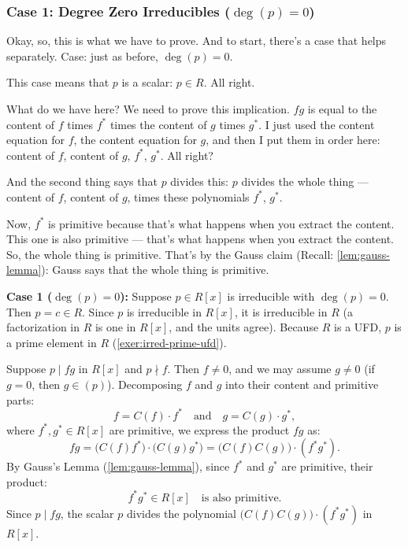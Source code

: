 \begin{proofWrapper}
\subsubsection{Case 1: Degree Zero Irreducibles (\texorpdfstring{$\deg(p) = 0$}{deg(p) = 0})}

\begin{speech}[00:33:17 - 00:34:58]
Okay, so, this is what we have to prove. And to start, there's a case that helps separately. Case:  just as before, $\deg(p) = 0$. 

This case means that $p$ is a scalar: $p \in R$.  All right.

What do we have here? We need to prove this implication. $fg$ is equal to the content of $f$ times $f^*$ times the content of $g$ times $g^*$.  I just used the content equation for $f$, the content equation for $g$, and then I put them in order here: content of $f$, content of $g$, $f^*$, $g^*$.  All right?

And the second thing says that $p$ divides this: $p$ divides the whole thing  --- content of $f$, content of $g$, times these polynomials $f^*$, $g^*$.

Now, $f^*$ is primitive because that's what happens when you extract the content.  This one is also primitive  --- that's what happens when you extract the content. So, the whole thing is primitive.  That's by the Gauss claim (Recall: \cref{lem:gauss-lemma}): Gauss says that the whole thing is primitive. 
\end{speech}

\begin{content}
\textbf{Case 1 ($\deg(p) = 0$):}
Suppose $p \in R[x]$ is irreducible with $\deg(p) = 0$. Then $p = c \in R$.
Since $p$ is irreducible in $R[x]$, it is irreducible in $R$ (a factorization in $R$ is one in $R[x]$, and the units agree). Because $R$ is a UFD, $p$ is a prime element in $R$ (\cref{exer:irred-prime-ufd}).

Suppose $p \mid fg$ in $R[x]$ and $p \nmid f$. Then $f \neq 0$, and we may assume $g \neq 0$ (if $g = 0$, then $g \in (p)$).
Decomposing $f$ and $g$ into their content and primitive parts:
\[
f = C(f) \cdot f^* \quad \text{and} \quad g = C(g) \cdot g^*,
\]
where $f^*, g^* \in R[x]$ are primitive, we express the product $fg$ as:
\[
fg = \bigl(C(f) f^*\bigr) \cdot \bigl(C(g) g^*\bigr) = \bigl(C(f) C(g)\bigr) \cdot (f^* g^*).
\]
By Gauss's Lemma (\cref{lem:gauss-lemma}), since $f^*$ and $g^*$ are primitive, their product:
\[
f^* g^* \in R[x] \quad \text{is also primitive}.
\]
Since $p \mid fg$, the scalar $p$ divides the polynomial $\bigl(C(f) C(g)\bigr) \cdot (f^* g^*)$ in $R[x]$.
\end{content}


\end{proofWrapper}
